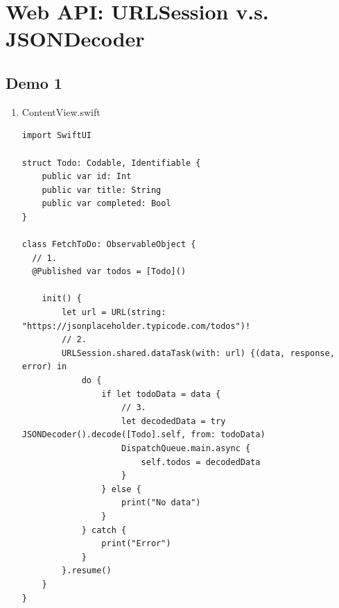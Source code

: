 \documentclass[a4paper,12pt]{article}
\begin{document}
\section{Web API: URLSession v.s. JSONDecoder}
\label{sec:org94632ac}
\subsection{Demo 1}
\label{sec:orga5669b8}
\begin{enumerate}
\item ContentView.swift
\label{sec:org0328c8d}
\lstset{breaklines=true,language=swift,label= ,caption= ,captionpos=b,firstnumber=1,numbers=left}
\begin{lstlisting}
import SwiftUI

struct Todo: Codable, Identifiable {
    public var id: Int
    public var title: String
    public var completed: Bool
}

class FetchToDo: ObservableObject {
  // 1.
  @Published var todos = [Todo]()

    init() {
        let url = URL(string: "https://jsonplaceholder.typicode.com/todos")!
        // 2.
        URLSession.shared.dataTask(with: url) {(data, response, error) in
            do {
                if let todoData = data {
                    // 3.
                    let decodedData = try JSONDecoder().decode([Todo].self, from: todoData)
                    DispatchQueue.main.async {
                        self.todos = decodedData
                    }
                } else {
                    print("No data")
                }
            } catch {
                print("Error")
            }
        }.resume()
    }
}


\end{lstlisting}
\end{enumerate}
\end{document}
